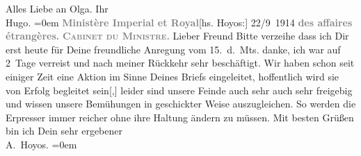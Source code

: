 \begin{ledgroupsized}[t]{13cm}
           \pstart
           Alles Liebe an Olga.\pend
           \pstart
           Ihr{\\[\baselineskip]}\spacefill\mbox{Hugo.}\pend
           \leftskip=0em{}{\bigskip}\pstart
           \noindent{}{\pb}\textcolor{gray}{\textbf{Ministère Imperial et Royal}}\hfill {[}hs. Hoyos:{]} 22/9 1914\pend
           \pstart
           \textcolor{gray}{\textbf{des affaires étrangères.}}\pend
           \pstart
           \textcolor{gray}{\textbf{\textsc{Cabinet du Ministre.}}}\pend
           \pstart{}Lieber Freund\pend\pstart
           Bitte verzeihe dass ich Dir erst heute für Deine freundliche Anregung vom
                  15. d. Mts. danke, ich war auf 2 Tage verreist und nach meiner
               Rückkehr sehr beschäftigt. Wir haben schon seit einiger Zeit eine Aktion im Sinne
               Deines Briefs {\pb}eingeleitet,
               hoffentlich wird sie von Erfolg begleitet sein{[},{]} leider sind
               unsere Feinde auch sehr auch sehr freigebig und wissen unsere Bemühungen in
               geschickter Weise auszugleichen. So werden die Erpresser immer reicher ohne ihre
               Haltung ändern zu müssen.\pend
           \pstart
           Mit besten Grüßen bin ich {\pb}Dein sehr ergebener {\\[\baselineskip]}\spacefill\mbox{A. Hoyos.}\pend
           \leftskip=0em{}\endnumbering{}\end{ledgroupsized}  \newcommand{\dateiname}{L02197}\newcommand{\titel}{Hugo von Hofmannsthal an Arthur Schnitzler, 24. 9. [1914]}\newcommand{\editorInnen}{Martin Anton Müller und Gerd-Hermann Susen}
      